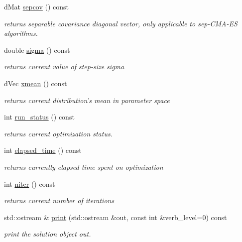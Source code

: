 \begin{DoxyCompactItemize}
d\-Mat \hyperlink{classlibcmaes_1_1CMASolutions_ab79973d3d76c8ffb810608252ba72df9}{sepcov} () const 
\begin{DoxyCompactList}\small\item\em returns separable covariance diagonal vector, only applicable to sep-\/\-C\-M\-A-\/\-E\-S algorithms. \end{DoxyCompactList}\item 
double \hyperlink{classlibcmaes_1_1CMASolutions_a8790ac429e629856d2295e953cbe2324}{sigma} () const 
\begin{DoxyCompactList}\small\item\em returns current value of step-\/size sigma \end{DoxyCompactList}\item 
d\-Vec \hyperlink{classlibcmaes_1_1CMASolutions_ab8d63d0079eff716421f82a8ec874ca4}{xmean} () const 
\begin{DoxyCompactList}\small\item\em returns current distribution's mean in parameter space \end{DoxyCompactList}\item 
int \hyperlink{classlibcmaes_1_1CMASolutions_a4215c5baf357d23ef893eb52b4766eea}{run\-\_\-status} () const 
\begin{DoxyCompactList}\small\item\em returns current optimization status. \end{DoxyCompactList}\item 
int \hyperlink{classlibcmaes_1_1CMASolutions_add680b4437a6a2786b7a6228fa73023e}{elapsed\-\_\-time} () const 
\begin{DoxyCompactList}\small\item\em returns currently elapsed time spent on optimization \end{DoxyCompactList}\item 
int \hyperlink{classlibcmaes_1_1CMASolutions_aceb58df5ee91f159e626b51ee788c381}{niter} () const 
\begin{DoxyCompactList}\small\item\em returns current number of iterations \end{DoxyCompactList}\item 
std\-::ostream \& \hyperlink{classlibcmaes_1_1CMASolutions_a6efb92b35de0ffa6cbe5918c82469db2}{print} (std\-::ostream \&out, const int \&verb\-\_\-level=0) const 
\begin{DoxyCompactList}\small\item\em print the solution object out. \end{DoxyCompactList}\end{DoxyCompactItemize}
